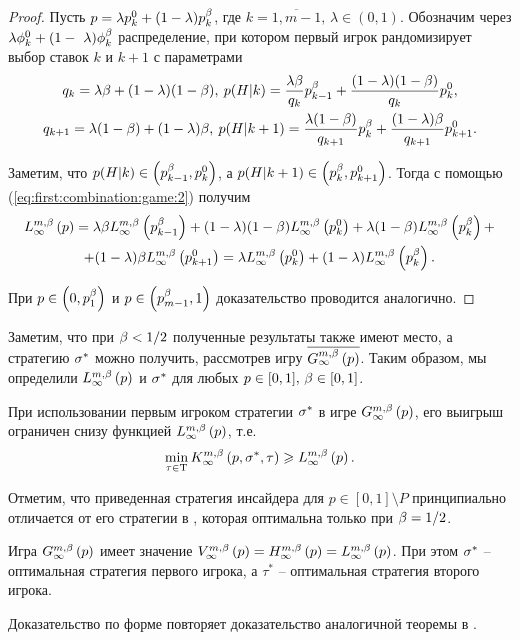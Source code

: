 \begin{proof}
  Пусть $p = \lambda\pEven + (1-\lambda)\pOdd$, где $k = \overline{1, m
    - 1}, \, \lambda \in (0, 1)$. Обозначим через $\lambda\fEven +
  (1-~\lambda)\fOdd$ распределение, при котором первый игрок
  рандомизирует выбор ставок $k$ и $k+1$ с параметрами
  \begin{gather*}
    q_k = \lambda\Co + (1-\lambda)(1-\Co), \: p(H|k) =
    \frac{\lambda\Co}{q_k}\pOdd[k-1] +
    \frac{(1-\lambda)(1-\Co)}{q_k} \pEven,\\
    q_{k+1} = \lambda(1-\Co) + (1-\lambda)\Co, \: p(H|k+1) =
    \frac{\lambda(1-\Co)}{q_{k+1}}\pOdd[k] +
    \frac{(1-\lambda)\Co}{q_{k+1}}\pEven[k+1].
  \end{gather*}
  
  Заметим, что $p(H|k) \in \left( \pOdd[k-1], \pEven \right)$, а
  $p(H|k+1) \in \left( \pOdd, \pEven[k+1] \right)$. Тогда с помощью
  (\ref{eq:first:combination:game:2}) получим
  \begin{multline*}
    \lowerBound{p} = \lambda \Co \lowerBound{\pOdd[k-1]} + (1-\lambda)(1-\Co)\lowerBound{\pEven} + \lambda(1-\Co)\lowerBound{\pOdd} + \\
    + (1-\lambda)\Co\lowerBound{\pEven[k+1]} = \lambda
    \lowerBound{\pEven} + (1-\lambda) \lowerBound{\pOdd}.
  \end{multline*}
  
  При $p \in \left( 0, \pOdd[1] \right)$ и $p \in \left( \pOdd[m-1], 1
  \right)$ доказательство проводится аналогично.
\end{proof}

Заметим, что при $\Co < 1/2$ полученные результаты также имеют место,
а стратегию $\fOpt$ можно получить, рассмотрев игру
$\symm{\infiniteGame{p}}$. Таким образом, мы определили $\lowerBound{p}$
и $\fOpt$ для любых $p \in [0, 1], \, \Co \in [0, 1]$.

\begin{lemma}
  \label{lemma:first:lower}
  При использовании первым игроком стратегии $\fOpt$ в игре
  $\infiniteGame{p}$\textup{,} его выигрыш ограничен снизу функцией
  $\lowerBound{p}$\textup{,} т.е.
  \[
    \min_{\tau \in \Tau} \infiniteFirstPlayerPayoff{p}{\fOpt}{\tau} \geq
    \lowerBound{p}.
  \]
\end{lemma}

Отметим, что приведенная стратегия инсайдера для $p \in [0, 1] \setminus
P$ принципиально отличается от его стратегии в \cite{pyanykh14}, которая
оптимальна только при $\Co = 1/2$.

\begin{theorem}
  Игра $\infiniteGame{p}$ имеет значение $\infiniteGameValue{p} = \upperBound{p}
  = \lowerBound{p}$. При этом $\fOpt$ -- оптимальная стратегия первого
  игрока\textup{,} а $\tau^*$ -- оптимальная стратегия второго игрока.
\end{theorem}
Доказательство по форме повторяет доказательство аналогичной теоремы в
\cite{domansky07}.

